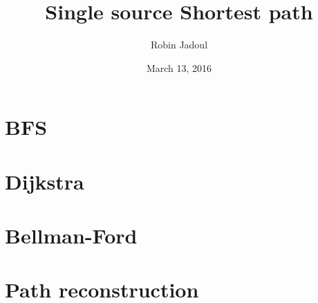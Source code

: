 \documentclass{beamer}
\title{Single source Shortest path}
\author{Robin Jadoul}
\date{March 13, 2016}
\institute
{
    \texttt{[image: ../shared-img/beoi-logo.png]}
}
\begin{document}
\frame{\titlepage}

\section[BFS]{BFS}


\section[Dijkstra]{Dijkstra}


\section[Bellman-Ford]{Bellman-Ford}


\section[Path reconstruction]{Path reconstruction}


%
\end{document}
